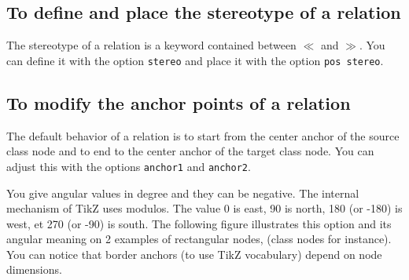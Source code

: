 \documentclass[a4paper,11pt]{report}
\newcommand{\inputTikZ}[1]{%
  }%
\newcommand{\inputTikZ}[1]{%
    \texttt{[image: fig/\#1.pdf]}%
  }%
\newcommand{\TikZ}{{\sc TikZ} \xspace}
\begin{document}
\subsection{To define and place the stereotype of a relation}\label{ss.relstereo}

The stereotype of a relation is a keyword contained between $\ll$ and $\gg$. 
You can define it with the option {\tt stereo} and place it with the option \hypertarget{posstereo}{{\tt pos stereo}}.

\medskip

\begin{minipage}{0.5\textwidth}

\end{minipage}
\begin{minipage}{0.4\textwidth}
\begin{center}
\inputTikZ{relationstereo}
\end{center}
\end{minipage}

\subsection{To modify the anchor points of a relation}\label{ss.relanchor}

The default behavior of a relation is to start from the center anchor of the source class node and to end to the center anchor of the target class node.
You can adjust this with the options \hypertarget{anchor1}{{\tt anchor1}} and \hypertarget{anchor2}{{\tt anchor2}}.

\medskip

\begin{minipage}{0.6\textwidth}

\end{minipage}
\begin{minipage}{0.4\textwidth}
\begin{center}
\inputTikZ{relationanchor}
\end{center}
\end{minipage}

\medskip

You give angular values in degree and they can be negative. The internal mechanism of \TikZ uses modulos. The value 0 is east, 90 is north, 180 (or -180) is west, et 270 (or -90) is south. The following figure illustrates this option and its angular meaning on 2 examples of rectangular nodes, (class nodes for instance). You can notice that border anchors (to use \TikZ vocabulary) depend on node dimensions.
\end{document}
